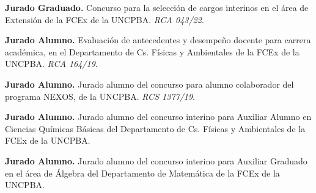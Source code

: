 \textbf{Jurado Graduado.} Concurso para la selección de cargos interinos en el área de Extensión de la FCEx de la UNCPBA. \textit{RCA 043/22}.

\textbf{Jurado Alumno.} Evaluación de antecedentes y desempeño docente para carrera académica, en el Departamento de Cs. Físicas y Ambientales de la FCEx de la UNCPBA. \textit{RCA 164/19}.

\textbf{Jurado Alumno.} Jurado alumno del concurso para alumno colaborador del programa NEXOS, de la UNCPBA. \textit{RCS 1377/19}.

\textbf{Jurado Alumno.} Jurado alumno del concurso interino para Auxiliar Alumno en Ciencias Químicas Básicas del Departamento de Cs. Físicas y Ambientales de la FCEx de la UNCPBA.

\textbf{Jurado Alumno.} Jurado alumno del concurso interino para Auxiliar Graduado en el área de Álgebra del Departamento de Matemática de la FCEx de la UNCPBA.